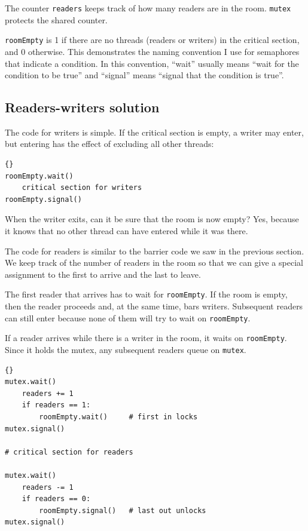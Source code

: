 \documentclass{book}
\newcommand{\clearemptydoublepage}{\newpage\cleardoublepage}
\begin{document}
The counter {\tt readers} keeps track of how many readers
are in the room.  {\tt mutex} protects the shared counter.

{\tt roomEmpty} is 1 if there are no threads (readers or writers) in
the critical section, and 0 otherwise.  This demonstrates the naming
convention I use for semaphores that indicate a condition.  In
this convention, ``wait'' usually means ``wait for the condition to
be true'' and ``signal'' means ``signal that the condition is true''.


\clearemptydoublepage
\subsection {Readers-writers solution}

The code for writers is simple.  If the critical section
is empty, a writer may enter, but entering has the effect
of excluding all other threads:

\begin{latin}
\begin{latin}
\begin{lstlisting}[title={Writers solution}]{}
roomEmpty.wait()
    critical section for writers
roomEmpty.signal()
\end{lstlisting}
\end{latin}
\end{latin}

When the writer exits, can it be sure that the room is
now empty?  Yes, because it knows that no other thread can
have entered while it was there.

The code for readers is similar to the barrier code we
saw in the previous section.  We keep track of the number
of readers in the room so that we can give a special assignment
to the first to arrive and the last to leave.

The first reader that arrives has to wait for {\tt roomEmpty}.
If the room is empty, then the reader proceeds and, at the
same time, bars writers.  Subsequent readers can still enter
because none of them will try to wait on {\tt roomEmpty}.

If a reader arrives while there is a writer in the room,
it waits on {\tt roomEmpty}.  Since it holds the mutex, any
subsequent readers queue on {\tt mutex}.

\begin{latin}
\begin{latin}
\begin{lstlisting}[title={Readers solution}]{}
mutex.wait()
    readers += 1
    if readers == 1:
        roomEmpty.wait()     # first in locks
mutex.signal()

# critical section for readers

mutex.wait()
    readers -= 1
    if readers == 0:
        roomEmpty.signal()   # last out unlocks
mutex.signal()
\end{lstlisting}
\end{latin}
\end{latin}
\end{document}
